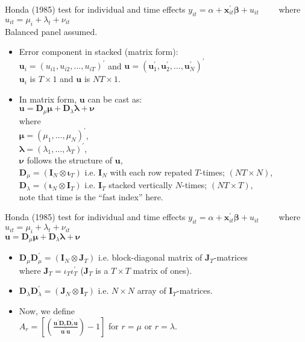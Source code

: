 \documentclass{beamer}
\begin{document}
\begin{frame}{Honda (1985) test for individual and time effects}
$y_{it} = \alpha + \bm{x}^{\prime}_{it} \bm{\beta} + u_{it} \qquad$    where $u_{it}=\mu_i + \lambda_t + \nu_{it}$\\ \smallskip Balanced panel assumed. \bigskip
\begin{itemize}
    \item Error component in stacked (matrix form): \\ \smallskip
    $\bm{u}_i = \left( u_{i1}, u_{i2}, \dots, u_{iT} \right)^{\prime}$ and $\bm{u} = \left( \bm{u}_1^{\prime}, \bm{u}_2^{\prime}, \dots, \bm{u}_N^{\prime} \right)^{\prime}$ \\ \smallskip
    $\bm{u}_i$ is $T \times 1$ and $\bm{u}$ is $NT \times 1$.
    \medskip
    \item In matrix form, $\bm{u}$ can be cast as: \\
    $\bm{u} = \bm{D}_{\mu} \bm{\mu} + \bm{D}_{\lambda} \bm{\lambda} + \bm{\nu}$ \\ \smallskip
    where \\$\bm{\mu} = (\mu_1, \dots, \mu_N)^{\prime}$, \\$\bm{\lambda} = (\lambda_1, \dots, \lambda_T)^{\prime}$, \\$\bm{\nu}$ follows the structure of $\bm{u}$,\\
    $\bm{D}_{\mu} = (\bm{I}_N \otimes \bm{\iota}_T)$ i.e. $\bm{I}_N$ with each row repated $T$-times; $(NT \times N)$, \\
    $\bm{D}_{\lambda} = ( \bm{\iota}_N \otimes \bm{I}_T )$ i.e. $\bm{I}_T$ stacked vertically $N$-times; $(NT \times T)$, \\ 
    note that time is the ``fast index'' here.
    \end{itemize}
\end{frame}
\begin{frame}{Honda (1985) test for individual and time effects}
$y_{it} = \alpha + \bm{x}^{\prime}_{it} \bm{\beta} + u_{it} \qquad$    where $u_{it}=\mu_i + \lambda_t + \nu_{it}$\\ \medskip
$\bm{u} = \bm{D}_{\mu} \bm{\mu} + \bm{D}_{\lambda} \bm{\lambda} + \bm{\nu}$ \\ \bigskip
\begin{itemize}
    \item $\bm{D}_{\mu} \bm{D}_{\mu}^{\prime} = \left(\bm{I}_N \otimes \bm{J}_T \right)$ i.e. block-diagonal matrix of $\bm{J}_T$-matrices \\where $\bm{J}_T=\iota_T \iota_T^{\prime}$  ($\bm{J}_T$ is a $T \times T$ matrix of ones).
    \medskip
    \item $\bm{D}_{\lambda} \bm{D}_{\lambda}^{\prime} = \left(\bm{J}_N \otimes \bm{I}_T   \right)$ i.e. $N\times N$ array of $\bm{I}_T$-matrices.
    \medskip
    \item Now, we define\\ \medskip
    $A_r = \left[ \left( \frac{\bm{u}^{\prime}\bm{D}_r \bm{D}_r^{\prime} \bm{u}}{\bm{u}^{\prime}\bm{u}} \right) - 1 \right]$ for $r=\mu$ or $r=\lambda$.
    \end{itemize}
\end{frame}
\end{document}

